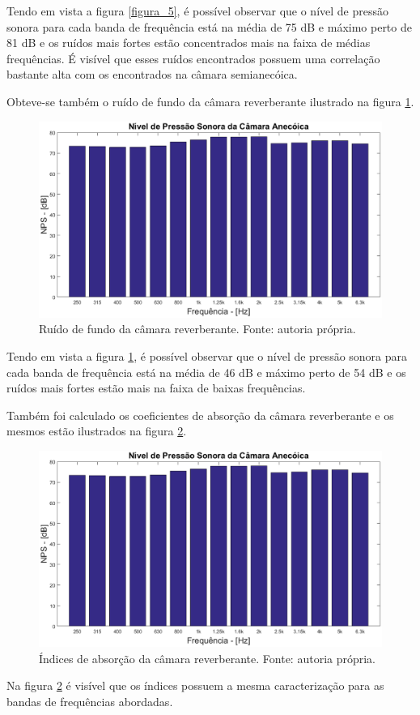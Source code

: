 Tendo em vista a figura \ref{figura_5}, é possível observar que o nível de pressão sonora para cada banda de frequência está na média de 75 dB e máximo perto de 81 dB e os ruídos mais fortes estão concentrados mais na faixa de médias frequências. É visível que esses ruídos encontrados possuem uma correlação bastante alta com os encontrados na câmara semianecóica.

\newpage
Obteve-se também o ruído de fundo da câmara reverberante ilustrado na figura \ref{figura_6}.
\begin{figure}[h!]
    \hspace{-4.5cm}
    \includegraphics[width=1.6\textwidth]{figuras/P_anecoica.eps}
    \caption{Ruído de fundo da câmara reverberante. Fonte: autoria própria.}
    \label{figura_6}
\end{figure}

Tendo em vista a figura \ref{figura_6}, é possível observar que o nível de pressão sonora para cada banda de frequência está na média de 46 dB e máximo perto de 54 dB e os ruídos mais fortes estão mais na faixa de baixas frequências. 

\newpage
Também foi calculado os coeficientes de absorção da câmara reverberante e os mesmos estão ilustrados na figura \ref{figura_7}.
\begin{figure}[h!]
    \hspace{-4.5cm}
    \includegraphics[width=1.6\textwidth]{figuras/P_anecoica.eps}
    \caption{Índices de absorção da câmara reverberante. Fonte: autoria própria.}
    \label{figura_7}
\end{figure}
Na figura \ref{figura_7} é visível que os índices possuem a mesma caracterização para as bandas de frequências abordadas.

